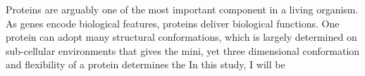 Proteins are arguably one of the most important component in a living organism. As genes encode biological features, proteins deliver biological functions. One protein can adopt many structural conformations, which is largely determined on sub-cellular environments that gives the mini, yet three dimensional conformation and flexibility of a protein determines the     In this study, I will be 